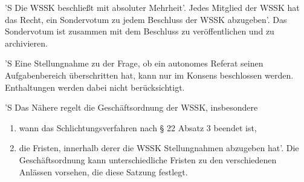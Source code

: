 \documentclass[fontsize=12pt,parskip=half]{scrartcl}
\begin{document}
\begin{contract}

  'S Die WSSK beschließt mit absoluter Mehrheit'. Jedes Mitglied der WSSK hat das
  Recht, ein Sondervotum zu jedem Beschluss der WSSK abzugeben'. Das Sondervotum
  ist zusammen mit dem Beschluss zu veröffentlichen und zu archivieren.

  'S Eine Stellungnahme zu der Frage, ob ein autonomes Referat seinen
  Aufgabenbereich überschritten hat, kann nur im Konsens beschlossen werden.
  Enthaltungen werden dabei nicht berücksichtigt.

  'S Das Nähere regelt die Geschäftsordnung der WSSK, insbesondere
  \begin{enumerate}[\qquad 1.]
  \item wann das Schlichtungsverfahren nach § 22 Absatz 3 beendet ist,
  \item die Fristen, innerhalb derer die WSSK Stellungnahmen abzugeben hat'. Die
    Geschäftsordnung kann unterschiedliche Fristen zu den verschiedenen Anlässen
    vorsehen, die diese Satzung festlegt.
  \end{enumerate}

\end{contract}
\end{document}
